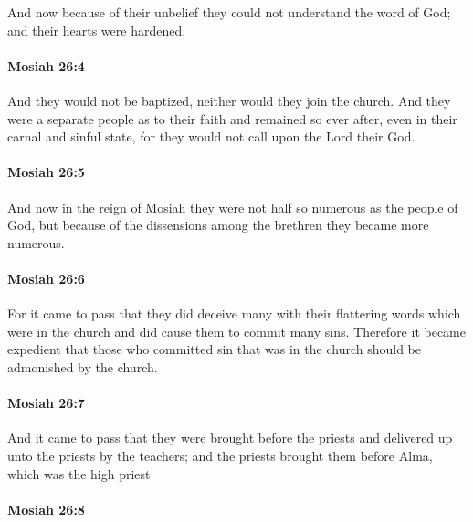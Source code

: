 			And now because of their unbelief
			they could not understand the word of God;
			and their hearts were hardened.

		\paragraph{Mosiah 26:4} %
			\label{MOSIAH-26-4}

			And they would not be baptized,
			neither would they join the church.
			And they were a separate people as to their faith and remained so ever after,
			even in their carnal and sinful state,
			for they would not call upon the Lord their God.

		\paragraph{Mosiah 26:5} %
			\label{MOSIAH-26-5}

			And now in the reign of Mosiah
			they were not half so numerous as the people of God,
			but because of the dissensions among the brethren
			they became more numerous.

		\paragraph{Mosiah 26:6} %
			\label{MOSIAH-26-6}

			For it came to pass that
			they did deceive many with their flattering words
			which were in the church
			and did cause them to commit many sins.
			Therefore it became expedient
			that those who committed sin that was in the church
			should be admonished by the church.

		\paragraph{Mosiah 26:7} %
			\label{MOSIAH-26-7}

			And it came to pass that they were brought before the priests
			and delivered up unto the priests by the teachers;
			and the priests brought them before Alma, which was the high priest

		\paragraph{Mosiah 26:8} %
			\label{MOSIAH-26-8}

